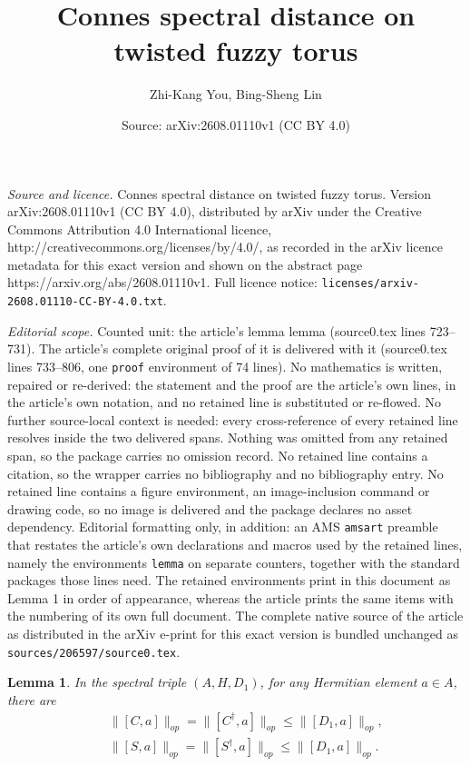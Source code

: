 \documentclass[10pt,a4paper]{amsart}
\title{Connes spectral distance on twisted fuzzy torus}
\author{Zhi-Kang You, Bing-Sheng Lin}
\date{Source: arXiv:2608.01110v1 (CC BY 4.0)}
\newtheorem{lemma}{Lemma}
\begin{document}
\maketitle

\noindent\emph{Source and licence.} Connes spectral distance on twisted fuzzy torus. Version arXiv:2608.01110v1 (CC BY 4.0), distributed by arXiv under the Creative Commons Attribution 4.0 International licence, http://creativecommons.org/licenses/by/4.0/, as recorded in the arXiv licence metadata for this exact version and shown on the abstract page https://arxiv.org/abs/2608.01110v1. Full licence notice: \texttt{licenses/arxiv-2608.01110-CC-BY-4.0.txt}.\par\smallskip

\noindent\textit{Editorial scope.} Counted unit: the article's lemma lemma (source0.tex lines 723--731). The article's complete original proof of it is delivered with it (source0.tex lines 733--806, one \texttt{proof} environment of 74 lines). No mathematics is written, repaired or re-derived: the statement and the proof are the article's own lines, in the article's own notation, and no retained line is substituted or re-flowed.  No further source-local context is needed: every cross-reference of every retained line resolves inside the two delivered spans.  Nothing was omitted from any retained span, so the package carries no omission record.  No retained line contains a citation, so the wrapper carries no bibliography and no bibliography entry.  No retained line contains a figure environment, an image-inclusion command or drawing code, so no image is delivered and the package declares no asset dependency.  Editorial formatting only, in addition: an AMS \texttt{amsart} preamble that restates the article's own declarations and macros used by the retained lines, namely the environments \texttt{lemma} on separate counters, together with the standard packages those lines need.  The retained environments print in this document as Lemma 1 in order of appearance, whereas the article prints the same items with the numbering of its own full document.  The complete native source of the article as distributed in the arXiv e-print for this exact version is bundled unchanged as \texttt{sources/206597/source0.tex}.
\begin{lemma}
  In the spectral triple $(A, H, D_1)$, for any Hermitian element $a \in A$,
  there are
  \begin{eqnarray}
    &&\|[C, a]\|_{op} = \|[C^{\dag}, a]\|_{op} \leqslant \|[D_1, a]\|_{op},
\nonumber\\
    &&\|[S, a]\|_{op} = \|[S^{\dag}, a]\|_{op} \leqslant \|[D_1, a]\|_{op} .
  \end{eqnarray}
\end{lemma}
\end{document}

